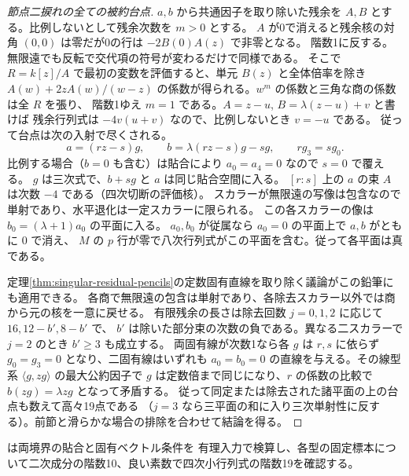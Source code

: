\begin{proof}[節点二捩れの全ての被約台点]
$a,b$ から共通因子を取り除いた残余を $A,B$ とする。比例しないとして残余次数を $m>0$ とする。
$A$ が0で消えると残余核の対角 $(0,0)$ は零だが0の行は $-2B(0)A(z)$ で非零となる。
階数1に反する。無限遠でも反転で交代項の符号が変わるだけで同様である。
そこで $R=k[z]/A$ で最初の変数を評価すると、単元 $B(z)$ と全体倍率を除き
$A(w)+2z A(w)/(w-z)$ の係数が得られる。$w^m$ の係数と三角な商の係数は全 $R$ を張り、
階数1ゆえ $m=1$ である。$A=z-u$, $B=\lambda(z-u)+v$ と書けば
残余行列式は $-4v(u+v)$ なので、比例しないとき $v=-u$ である。
従って台点は次の入射で尽くされる。
\[
       a=(rz-s)g,\qquad b=\lambda(rz-s)g-sg,\qquad r g_3=s g_0 .
\]
比例する場合（$b=0$ も含む）は貼合により $a_0=a_4=0$ なので $s=0$ で覆える。
$g$ は三次式で、$b+sg$ と $a$ は同じ貼合空間に入る。
$[r:s]$ 上の $a$ の束 $A$ は次数 $-4$ である（四次切断の評価核）。
スカラーが無限遠の写像は包含なので単射であり、水平退化は一定スカラーに限られる。
この各スカラーの像は $b_0=(\lambda+1)a_0$ の平面に入る。
$a_0,b_0$ が従属なら $a_0=0$ の平面上で $a,b$ がともに $0$ で消え、
$M$ の $p$ 行が零で八次行列式がこの平面を含む。従って各平面は真である。

定理\ref{thm:singular-residual-pencils}の定数固有直線を取り除く議論がこの鉛筆にも適用できる。
各商で無限遠の包含は単射であり、各除去スカラー以外では商から元の核を一意に戻せる。
有限残余の長さは除去回数 $j=0,1,2$ に応じて $16,12-b',8-b'$ で、
$b'$ は除いた部分束の次数の負である。異なる二スカラーで $j=2$ のとき $b'\ge3$ も成立する。
両固有線が次数1なら各 $g$ は $r,s$ に依らず $g_0=g_3=0$ となり、二固有線はいずれも
$a_0=b_0=0$ の直線を与える。その線型系 $\langle g,z g\rangle$ の最大公約因子で
$g$ は定数倍まで同じになり、$r$ の係数の比較で $b(zg)=\lambda zg$ となって矛盾する。
従って同定または除去された諸平面の上の台点も数えて高々19点である
（$j=3$ なら三平面の和に入り三次単射性に反する）。前節と滑らかな場合の排除を合わせて結論を得る。
\end{proof}

 は両境界の貼合と固有ベクトル条件を
有理入力で検算し、各型の固定標本について二次成分の階数10、良い素数で四次小行列式の階数19を確認する。
